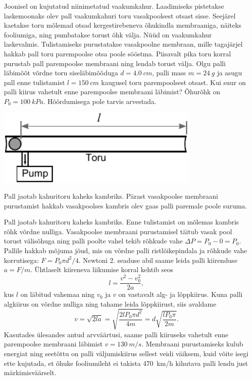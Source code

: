 
Joonisel on kujutatud niinimetatud vaakumkahur. Laadimiseks pistetakse laskemoonaks olev pall vaakumkahuri toru vasakpoolsest otsast sisse. Seejärel kaetakse toru mõlemad otsad kergestirebeneva õhukindla membraaniga, näiteks fooliumiga, ning pumbatakse torust õhk välja. Nüüd on vaakumkahur laskevalmis. Tulistamiseks purustatakse vasakpoolne membraan, mille tagajärjel hakkab pall toru parempoolse otsa poole sööstma. Piisavalt pika toru korral purustab pall parempoolse membraani ning lendab torust välja. Olgu palli läbimõõt võrdne toru siseläbimõõduga $d=\SI{4,0}{cm}$, palli mass $m=\SI{24}{g}$ ja asugu pall enne tulistamist $l=\SI{150}{cm}$ kaugusel toru parempoolsest otsast. Kui suur on palli kiirus vahetult enne parempoolse membraani läbimist? Õhurõhk on $P_0=\SI{100}{kPa}$. Hõõrdumisega pole tarvis arvestada.
\begin{center}
 \includegraphics[width=0.75\textwidth]{2014-lahg-02-vaakumkahur.pdf}
\end{center}

\hint
Pall jaotab kahuritoru kaheks kambriks. Pärast vasakpoolse membraani purustamist hakkab vasakpoolses kambris olev gaas palli paremale poole suruma.

\solu
Pall jaotab kahuritoru kaheks kambriks. Enne tulistamist on mõlemas kambris rõhk võrdne nulliga. Vasakpoolse membraani purustamisel täitub vasak pool torust välisõhuga ning palli poolte vahel tekib rõhkude vahe $\Delta P=P_0-0=P_0$. Pallile hakkab mõjuma jõud, mis on võrdne palli ristlõikepindala ja rõhkude vahe korrutisega: $F=P_0\pi d^2/4$. Newtoni 2. seaduse abil saame leida palli kiirenduse $a=F/m$. Ühtlaselt kiireneva liikumise korral kehtib seos
\[ l=\frac{v^2-v_0^2}{2a}, \]
kus $l$ on läbitud vahemaa ning $v_0$ ja $v$ on vastavalt alg- ja lõppkiirus. Kuna palli algkiirus on võrdne nulliga ning tahame leida lõppkiirust, siis avaldame
\[ v=\sqrt{2la}=\sqrt{\frac{2lP_0\pi d^2}{4m}}=d\sqrt{\frac{lP_0\pi}{2m}}.\]
Kasutades ülesandes antud arvväärtusi, saame palli kiiruseks vahetult enne parempoolse membraani läbimist $v=\SI{130}{m/s}$. Membraani purustamiseks kulub energiat ning seetõttu on palli väljumiskiirus sellest veidi väiksem, kuid võite isegi ette kujutada, et õhuke fooliumileht ei takista \SI{470}{km/h} kihutava palli lendu just märkimisväärselt.


